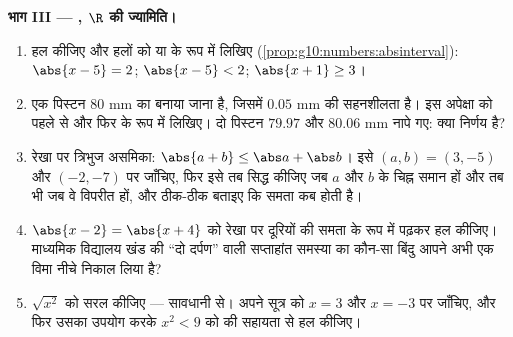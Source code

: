 \begin{problem}
\medskip
\noindent\textbf{भाग III --- , $\R$ की ज्यामिति।}
\begin{enumerate}[resume]
  \item हल कीजिए और हलों को  या  के रूप में लिखिए
        (\cref{prop:g10:numbers:absinterval}):
        $\abs{x - 5} = 2$; \quad $\abs{x - 5} < 2$; \quad
        $\abs{x + 1} \geq 3$।
  \item एक पिस्टन $80$ mm का बनाया जाना है, जिसमें $0.05$ mm की सहनशीलता
        है। इस अपेक्षा को पहले  से और फिर  के रूप में
        लिखिए। दो पिस्टन $79.97$ और $80.06$ mm नापे गए: क्या निर्णय है?
  \item रेखा पर त्रिभुज असमिका: $\abs{a + b} \leq \abs a + \abs b$। इसे $(a, b) = (3, -5)$ और $(-2, -7)$ पर जाँचिए,
        फिर इसे तब सिद्ध कीजिए जब $a$ और $b$ के चिह्न समान हों और तब
        भी जब वे विपरीत हों, और ठीक-ठीक बताइए कि समता कब होती है।
  \item $\abs{x - 2} = \abs{x + 4}$ को रेखा पर दूरियों की समता के रूप में पढ़कर हल कीजिए।
        माध्यमिक विद्यालय खंड की ``दो दर्पण'' वाली सप्ताहांत समस्या का
        कौन-सा बिंदु आपने अभी एक विमा नीचे निकाल लिया है?
  \item $\sqrt{x^2}$ को सरल कीजिए --- सावधानी से। अपने सूत्र को $x = 3$ और $x = -3$
        पर जाँचिए, और फिर उसका उपयोग करके $x^2 < 9$ को  की सहायता
        से हल कीजिए।
\end{enumerate}


\end{problem}

